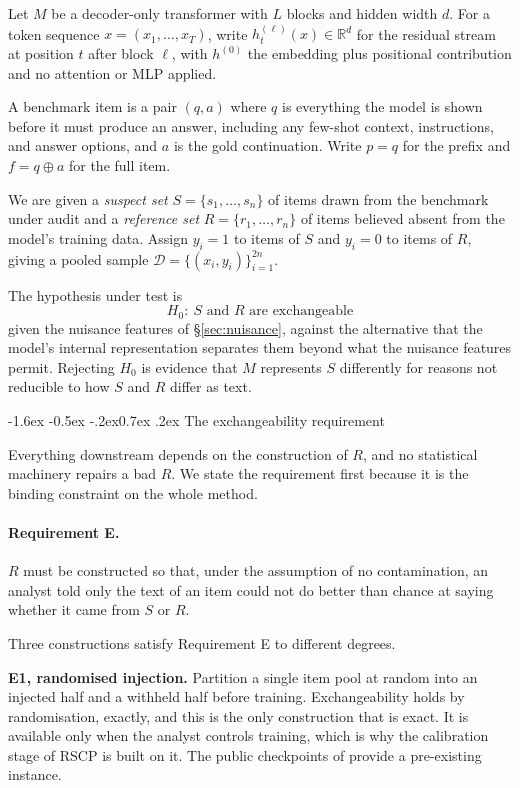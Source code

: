 \documentclass[10pt,twocolumn,letterpaper]{article}
\makeatletter
\renewcommand\subsection{\@startsection{subsection}{2}{\z@}%
  {-1.6ex \@plus -0.5ex \@minus -.2ex}{0.7ex \@plus .2ex}%
  {\normalfont\normalsize\bfseries}}
\newcommand{\Real}{\mathbb{R}}
\makeatother
\begin{document}
Let $M$ be a decoder-only transformer with $L$ blocks and hidden width $d$. For a token sequence $x=(x_1,\dots,x_T)$, write $h^{(\ell)}_t(x)\in\Real^d$ for the residual stream at position $t$ after block $\ell$, with $h^{(0)}$ the embedding plus positional contribution and no attention or MLP applied.

A benchmark item is a pair $(q,a)$ where $q$ is everything the model is shown before it must produce an answer, including any few-shot context, instructions, and answer options, and $a$ is the gold continuation. Write $p=q$ for the prefix and $f=q\oplus a$ for the full item.

We are given a \emph{suspect set} $S=\{s_1,\dots,s_n\}$ of items drawn from the benchmark under audit and a \emph{reference set} $R=\{r_1,\dots,r_n\}$ of items believed absent from the model's training data. Assign $y_i=1$ to items of $S$ and $y_i=0$ to items of $R$, giving a pooled sample $\mathcal{D}=\{(x_i,y_i)\}_{i=1}^{2n}$.

The hypothesis under test is
\[
H_0:\ \text{$S$ and $R$ are exchangeable}
\]
given the nuisance features of \S\ref{sec:nuisance}, against the alternative that the model's internal representation separates them beyond what the nuisance features permit. Rejecting $H_0$ is evidence that $M$ represents $S$ differently for reasons not reducible to how $S$ and $R$ differ as text.

\subsection{The exchangeability requirement}
\label{sec:exchange}

Everything downstream depends on the construction of $R$, and no statistical machinery repairs a bad $R$. We state the requirement first because it is the binding constraint on the whole method.

\paragraph{Requirement E.} $R$ must be constructed so that, under the assumption of no contamination, an analyst told only the text of an item could not do better than chance at saying whether it came from $S$ or $R$.

Three constructions satisfy Requirement E to different degrees.

\textbf{E1, randomised injection.} Partition a single item pool at random into an injected half and a withheld half before training. Exchangeability holds by randomisation, exactly, and this is the only construction that is exact. It is available only when the analyst controls training, which is why the calibration stage of RSCP is built on it. The public checkpoints of \citet{oren2024proving} provide a pre-existing instance.
\end{document}
